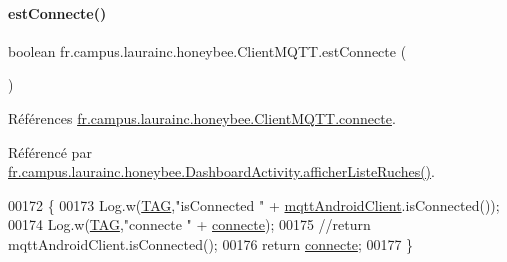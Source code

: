 \paragraph{\texorpdfstring{est\+Connecte()}{estConnecte()}}
{\footnotesize\ttfamily boolean fr.\+campus.\+laurainc.\+honeybee.\+Client\+M\+Q\+T\+T.\+est\+Connecte (\begin{DoxyParamCaption}{ }\end{DoxyParamCaption})}



Références \hyperlink{classfr_1_1campus_1_1laurainc_1_1honeybee_1_1_client_m_q_t_t_abf92ba9ac98a707353748665a738c1c0}{fr.\+campus.\+laurainc.\+honeybee.\+Client\+M\+Q\+T\+T.\+connecte}.



Référencé par \hyperlink{classfr_1_1campus_1_1laurainc_1_1honeybee_1_1_dashboard_activity_aeb7cdaf69c379e2b070e290130199543}{fr.\+campus.\+laurainc.\+honeybee.\+Dashboard\+Activity.\+afficher\+Liste\+Ruches()}.


\begin{DoxyCode}
00172                                  \{
00173         Log.w(\hyperlink{classfr_1_1campus_1_1laurainc_1_1honeybee_1_1_client_m_q_t_t_a378324f705f8d7870c5f7be0cea02890}{TAG},\textcolor{stringliteral}{"isConnected "} + \hyperlink{classfr_1_1campus_1_1laurainc_1_1honeybee_1_1_client_m_q_t_t_a587a9b6c785448cf3e37dc92bcac7961}{mqttAndroidClient}.isConnected());
00174         Log.w(\hyperlink{classfr_1_1campus_1_1laurainc_1_1honeybee_1_1_client_m_q_t_t_a378324f705f8d7870c5f7be0cea02890}{TAG},\textcolor{stringliteral}{"connecte "} + \hyperlink{classfr_1_1campus_1_1laurainc_1_1honeybee_1_1_client_m_q_t_t_abf92ba9ac98a707353748665a738c1c0}{connecte});
00175         \textcolor{comment}{//return mqttAndroidClient.isConnected();}
00176         \textcolor{keywordflow}{return} \hyperlink{classfr_1_1campus_1_1laurainc_1_1honeybee_1_1_client_m_q_t_t_abf92ba9ac98a707353748665a738c1c0}{connecte};
00177     \}
\end{DoxyCode}
\mbox{\label{classfr_1_1campus_1_1laurainc_1_1honeybee_1_1_client_m_q_t_t_a8ec5abba65d09f44e1c2c8f9ef652632}} 
